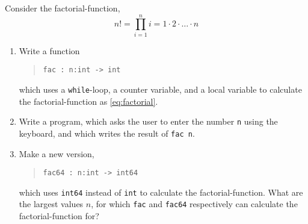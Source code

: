 Consider the factorial-function,
\begin{equation}
  n! = \prod_{i=1}^n i = 1\cdot 2\cdot \ldots \cdot n
  \label{eq:factorial}
\end{equation}
\begin{enumerate}
\item Write a function
  \begin{quote}
    \mbox{\lstinline!fac : n:int -> int!}
  \end{quote}
  which uses a \lstinline!while!-loop, a counter variable, and a local
  variable to calculate the factorial-function as \eqref{eq:factorial}.
  \item Write a program, which asks the user to enter the number
    \lstinline!n! using the keyboard, and which writes the result of \lstinline!fac n!.
  \item Make a new version, 
    \begin{quote}
      \mbox{\lstinline!fac64 : n:int -> int64!}
    \end{quote}
    which uses \lstinline{int64} instead of \lstinline{int} to
    calculate the factorial-function. What are the largest values $n$,
    for which \lstinline{fac} and \lstinline{fac64} respectively can
    calculate the factorial-function for?
  \end{enumerate}

